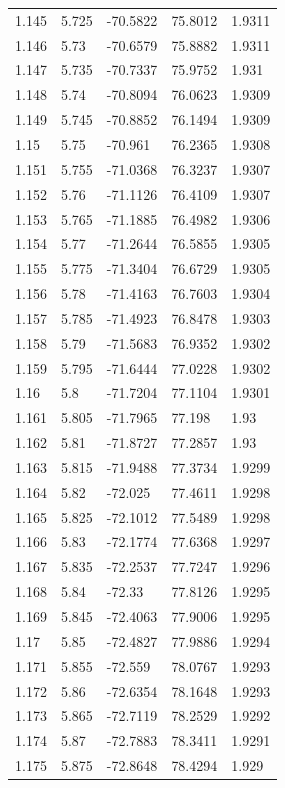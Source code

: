 \begin{tabular}{lllll}
1.145 & 5.725 & -70.5822 & 75.8012 & 1.9311 \\
1.146 & 5.73 & -70.6579 & 75.8882 & 1.9311 \\
1.147 & 5.735 & -70.7337 & 75.9752 & 1.931 \\
1.148 & 5.74 & -70.8094 & 76.0623 & 1.9309 \\
1.149 & 5.745 & -70.8852 & 76.1494 & 1.9309 \\
1.15 & 5.75 & -70.961 & 76.2365 & 1.9308 \\
1.151 & 5.755 & -71.0368 & 76.3237 & 1.9307 \\
1.152 & 5.76 & -71.1126 & 76.4109 & 1.9307 \\
1.153 & 5.765 & -71.1885 & 76.4982 & 1.9306 \\
1.154 & 5.77 & -71.2644 & 76.5855 & 1.9305 \\
1.155 & 5.775 & -71.3404 & 76.6729 & 1.9305 \\
1.156 & 5.78 & -71.4163 & 76.7603 & 1.9304 \\
1.157 & 5.785 & -71.4923 & 76.8478 & 1.9303 \\
1.158 & 5.79 & -71.5683 & 76.9352 & 1.9302 \\
1.159 & 5.795 & -71.6444 & 77.0228 & 1.9302 \\
1.16 & 5.8 & -71.7204 & 77.1104 & 1.9301 \\
1.161 & 5.805 & -71.7965 & 77.198 & 1.93 \\
1.162 & 5.81 & -71.8727 & 77.2857 & 1.93 \\
1.163 & 5.815 & -71.9488 & 77.3734 & 1.9299 \\
1.164 & 5.82 & -72.025 & 77.4611 & 1.9298 \\
1.165 & 5.825 & -72.1012 & 77.5489 & 1.9298 \\
1.166 & 5.83 & -72.1774 & 77.6368 & 1.9297 \\
1.167 & 5.835 & -72.2537 & 77.7247 & 1.9296 \\
1.168 & 5.84 & -72.33 & 77.8126 & 1.9295 \\
1.169 & 5.845 & -72.4063 & 77.9006 & 1.9295 \\
1.17 & 5.85 & -72.4827 & 77.9886 & 1.9294 \\
1.171 & 5.855 & -72.559 & 78.0767 & 1.9293 \\
1.172 & 5.86 & -72.6354 & 78.1648 & 1.9293 \\
1.173 & 5.865 & -72.7119 & 78.2529 & 1.9292 \\
1.174 & 5.87 & -72.7883 & 78.3411 & 1.9291 \\
1.175 & 5.875 & -72.8648 & 78.4294 & 1.929 \\

\end{tabular}
